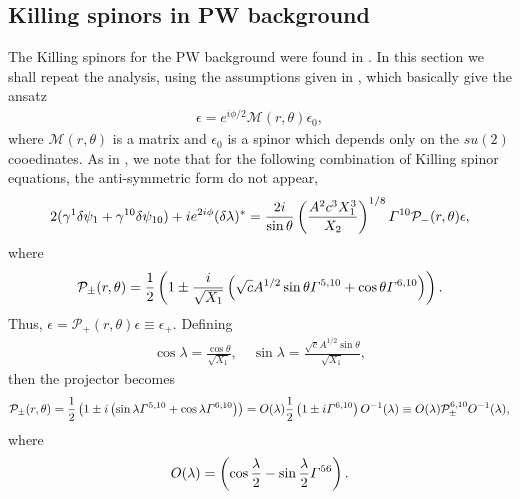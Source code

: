\documentclass[11pt]{article}
\let\oldGamma=\Gamma
\renewcommand{\Gamma}{\mathnormal{\oldGamma}}
\begin{document}
\subsection{Killing spinors in PW background}
The Killing spinors for the PW background were found in \cite{Pilch:2003jg}. In this section we shall repeat the analysis, using the assumptions given in \cite{Pilch:2003jg}, which basically give the ansatz
\begin{align}
\epsilon = e^{i\phi/2}\mathcal{M}(r,\theta)\epsilon_0,
\end{align}
where $\mathcal{M}(r,\theta)$ is a matrix and $\epsilon_0$ is a spinor which depends only on the $su(2)$ cooedinates.
As in \cite{Pilch:2003jg}, we note that for the following combination of Killing spinor equations, the anti-symmetric form do not appear,
\begin{align}
2(\gamma^1\delta\psi_1 + \gamma^{10}\delta\psi_{10}) + ie^{2 i \phi}(\delta\lambda)^*
=
\frac{2 i}{\sin\theta}\left(\frac{A^{2} c^3 X_1^3}{X_2}\right)^{1/8}\Gamma^{10}
\mathcal{P}_-(r,\theta)\epsilon,
\end{align}
where
\begin{align}
\mathcal{P}_\pm(r,\theta) = \frac{1}{2}\left(1 \pm \frac{i}{\sqrt{X_1}}\left(\sqrt{c}A^{1/2}\sin\theta\Gamma^{5,10} + \cos\theta\Gamma^{6,10}\right)\right).
\end{align}
Thus, $\epsilon = \mathcal{P}_+(r,\theta)\epsilon \equiv \epsilon_+$.
Defining
\begin{align}
\cos\lambda = \frac{\cos\theta}{\sqrt{X_1}}, \quad
\sin\lambda = \frac{\sqrt{c}A^{1/2}\sin\theta}{\sqrt{X_1}},
\end{align}
then the projector becomes
\begin{align}
\mathcal{P}_\pm(r,\theta) = \frac{1}{2}\left(1 \pm i \left(\sin\lambda\Gamma^{5,10} + \cos\lambda\Gamma^{6,10}\right)\right) =
O(\lambda) \frac{1}{2}\left(1\pm i\Gamma^{6,10}\right)O^{-1}(\lambda)
\equiv
O(\lambda) \mathcal{P}_{\pm}^{6,10}O^{-1}(\lambda),
\end{align}
where
\begin{align}\label{eq:rotmat56}
O(\lambda)  = \left(\cos\frac{\lambda}{2} - \sin\frac{\lambda}{2}\Gamma^{5 6}\right).
\end{align}
\end{document}
